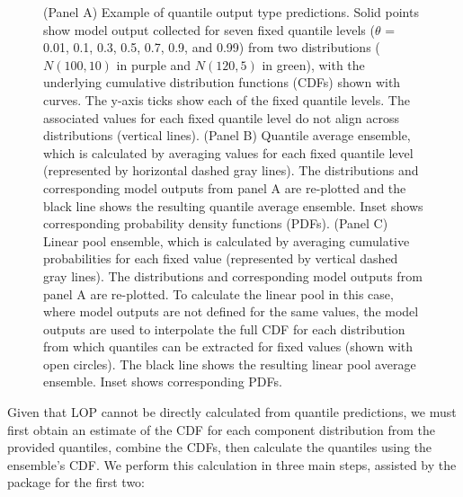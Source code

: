 \documentclass[
  article,
  shortnames,
  notitle]{jss}
\begin{document}
\begin{figure}


\caption{\label{fig-example-quantile-average-and-linear-pool}(Panel A)
Example of quantile output type predictions. Solid points show model
output collected for seven fixed quantile levels (\(\theta\) = 0.01,
0.1, 0.3, 0.5, 0.7, 0.9, and 0.99) from two distributions
(\(N(100, 10)\) in purple and \(N(120, 5)\) in green), with the
underlying cumulative distribution functions (CDFs) shown with curves.
The y-axis ticks show each of the fixed quantile levels. The associated
values for each fixed quantile level do not align across distributions
(vertical lines). (Panel B) Quantile average ensemble, which is
calculated by averaging values for each fixed quantile level
(represented by horizontal dashed gray lines). The distributions and
corresponding model outputs from panel A are re-plotted and the black
line shows the resulting quantile average ensemble. Inset shows
corresponding probability density functions (PDFs). (Panel C) Linear
pool ensemble, which is calculated by averaging cumulative probabilities
for each fixed value (represented by vertical dashed gray lines). The
distributions and corresponding model outputs from panel A are
re-plotted. To calculate the linear pool in this case, where model
outputs are not defined for the same values, the model outputs are used
to interpolate the full CDF for each distribution from which quantiles
can be extracted for fixed values (shown with open circles). The black
line shows the resulting linear pool average ensemble. Inset shows
corresponding PDFs.}

\end{figure}%

Given that LOP cannot be directly calculated from quantile predictions,
we must first obtain an estimate of the CDF for each component
distribution from the provided quantiles, combine the CDFs, then
calculate the quantiles using the ensemble's CDF. We perform this
calculation in three main steps, assisted by the  package
\citep{distfromq} for the first two:
\end{document}
